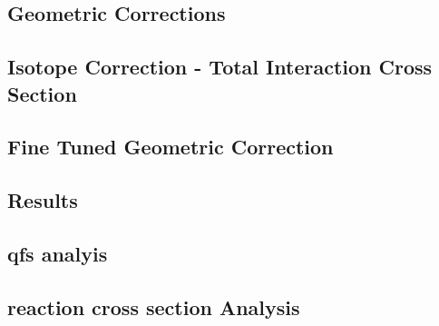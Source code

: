 \subsection{Geometric Corrections}
\subsection{Isotope Correction - Total Interaction Cross Section}
\subsection{Fine Tuned Geometric Correction}
\subsection{Results}
\subsection{qfs analyis}
\subsection{reaction cross section Analysis}

